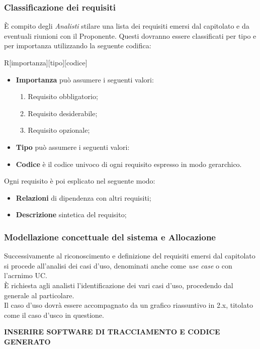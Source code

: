     \subsubsection{Classificazione dei requisiti}
      È compito degli \emph{Analisti} stilare una lista dei requisiti emersi dal capitolato e da eventuali riunioni con il Proponente. Questi dovranno essere
      classificati per tipo e per importanza utilizzando la seguente codifica:
      \begin{center}
        R[importanza][tipo][codice]
      \end{center}
      \begin{itemize}
        \item \textbf{Importanza} può assumere i seguenti valori:
          \bgroup
            \begin{enumerate}
              \item Requisito obbligatorio;
              \item Requisito desiderabile;
              \item Requisito opzionale;
            \end{enumerate}
          \egroup
        \item \textbf{Tipo} può assumere i seguenti valori:
          \bgroup
          \egroup
        \item \textbf{Codice} è il codice univoco di ogni requisito espresso in modo gerarchico.
      \end{itemize}
      Ogni requisito è poi esplicato nel seguente modo:
      \begin{itemize}
        \item \textbf{Relazioni} di dipendenza con altri requisiti;
        \item \textbf{Descrizione} sintetica del requisito;
      \end{itemize}
    \subsubsection{Modellazione concettuale del sistema e Allocazione}
      Successivamente al riconoscimento e definizione del requisiti emersi dal capitolato si procede all'analisi dei casi d'uso, denominati anche come
      \emph{use case} o con l'acrnimo UC.\\
      È richiesta agli analisti l'identificazione dei vari casi d'uso, procedendo dal generale al particolare.\\
      Il caso d'uso dovrà essere accompagnato da un grafico riassuntivo in 2.x, titolato come il caso d'usco in questione.\\
      \begin{center}
        \textbf{\large{INSERIRE SOFTWARE DI TRACCIAMENTO E CODICE GENERATO}}
      \end{center}
